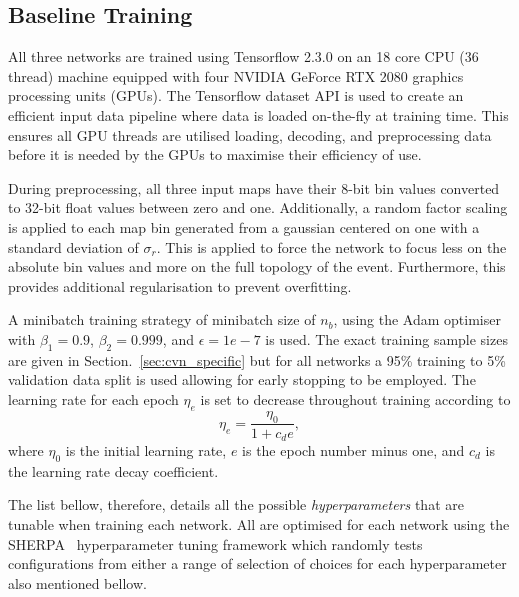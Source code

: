 \subsection{Baseline Training} %
\label{sec:cvn_baseline_training} %

All three networks are trained using Tensorflow 2.3.0 on an 18 core CPU (36 thread) machine
equipped with four NVIDIA GeForce RTX 2080 graphics processing units (GPUs). The Tensorflow
dataset API is used to create an efficient input data pipeline where data is loaded on-the-fly at
training time. This ensures all GPU threads are utilised loading, decoding, and preprocessing data
before it is needed by the GPUs to maximise their efficiency of use.

During preprocessing, all three input maps have their 8-bit bin values converted to 32-bit float
values between zero and one. Additionally, a random factor scaling is applied to each map bin
generated from a gaussian centered on one with a standard deviation of $\sigma_{r}$. This is
applied to force the network to focus less on the absolute bin values and more on the full
topology of the event. Furthermore, this provides additional regularisation to prevent
overfitting.

A minibatch training strategy of minibatch size of $n_{b}$, using the Adam
optimiser~\cite{kingma2014} with $\beta_{1}=0.9$, $\beta_{2}=0.999$, and $\epsilon = 1e-7$ is
used. The exact training sample sizes are given in Section.~\ref{sec:cvn_specific} but for all
networks a 95\% training to 5\% validation data split is used allowing for early stopping to be
employed. The learning rate for each epoch $\eta_{e}$ is set to decrease throughout training
according to
\begin{equation}
    \eta_{e}=\frac{\eta_{0}}{1+c_{d}e},
\end{equation}
where $\eta_{0}$ is the initial learning rate, $e$ is the epoch number minus one, and $c_{d}$ is
the learning rate decay coefficient.

The list bellow, therefore, details all the possible \emph{hyperparameters} that are tunable when
training each network. All are optimised for each network using the SHERPA~\cite{hertel2020}
hyperparameter tuning framework which randomly tests configurations from either a range of
selection of choices for each hyperparameter also mentioned bellow.

